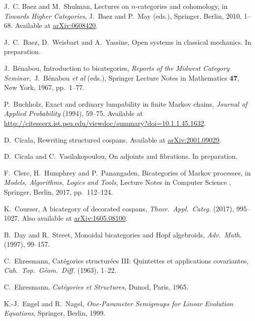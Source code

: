 \documentclass[oneside,final]{ucr}
\theoremstyle{definition}
\newcommand{\define}[1]{{\bf \boldmath #1}}
\begin{document}
{\begin{thebibliography}{1}
 J.\ C. Baez and M.\ Shulman, Lectures on $n$-categories and cohomology, in \textsl{Towards Higher Categories}, J.\ Baez and P.\ May (eds.), Springer, Berlin, 2010, 1--68. Available at \href{https://arxiv.org/abs/math/0608420}{arXiv:0608420}.

 J.\ C.\ Baez, D.\ Weisbart and A.\ Yassine, Open systems in classical mechanics. In preparation.
 
 J.\ B\'enabou, Introduction to bicategories,  \textsl{Reports
of the Midwest Category Seminar},\ J.\ B\'enabou \textit{et al} (eds.),
Springer Lecture Notes in Mathematics {\bf 47}, New York, 1967, pp.\ 1--77.

 P.\ Buchholz, Exact and ordinary lumpability in finite Markov chains, \textsl{Journal of Applied Probability} \define{31} (1994), 59--75.  Available at \href{http://citeseerx.ist.psu.edu/viewdoc/summary?doi=10.1.1.45.1632}{http://citeseerx.ist.psu.edu/viewdoc/summary?doi=10.1.1.45.1632}.

 D.\ Cicala, Rewriting structured cospans. Available at \href{https://arxiv.org/abs/2001.09029}{arXiv:2001.09029}.

 D.\ Cicala and C.\ Vasilakopoulou, On adjoints and fibrations. In preparation.

 F.\ Clerc, H.\ Humphrey and P.\ Panangaden, Bicategories of Markov processes, in 
\textsl{Models, Algorithms, Logics and Tools}, Lecture Notes in Computer Science \define{10460}, Springer, Berlin, 2017, pp.\ 112--124.  

 K.\ Courser, A bicategory of decorated cospans, \textsl{Theor.\ Appl.\ Categ.} \define{32} (2017), 995--1027. Also available at \href{https://arxiv.org/abs/1605.08100}{arXiv:1605.08100}.

 B.\ Day and R.\ Street, Monoidal bicategories and Hopf algebroids,
\textsl{Adv.\ Math.} \define{129} (1997), 99--157.


 C.\ Ehresmann, Cat\'egories structur\'ees III: Quintettes et applications covariantes,  \textsl{Cah.\ Top.\ G\'eom.\ Diff.} \define{5} (1963), 1--22.

 C.\ Ehresmann, \textsl{Cat\'egories et Structures,} Dunod, Paris, 1965.

 K.-J.\ Engel and R.\ Nagel, \textsl{One-Parameter Semigroups for Linear Evolution Equations}, Springer, Berlin, 1999.


\end{thebibliography}}
\end{document}
